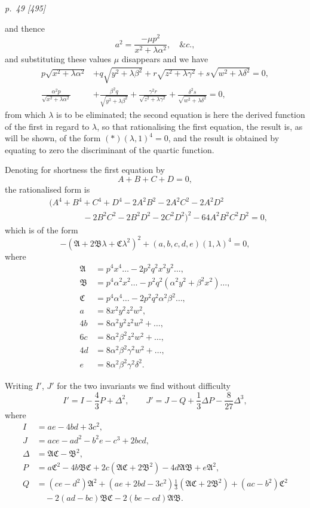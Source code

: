 ﻿\documentclass[11pt,a4paper]{article}
\theoremstyle{plain}
\theoremstyle{definition}
\newcommand{\frA}{\mathfrak{A}}
\newcommand{\frB}{\mathfrak{B}}
\newcommand{\frC}{\mathfrak{C}}
\begin{document}
\clearpage
\textit{p.~49 [495]}

and thence
\[
a^2=\frac{-\mu p^2}{x^2+\lambda\alpha^2},\quad \&c.,
\]
and substituting these values \(\mu\) disappears and we have
\[
\begin{aligned}
p\sqrt{x^2+\lambda\alpha^2}
&+q\sqrt{y^2+\lambda\beta^2}
+r\sqrt{z^2+\lambda\gamma^2}
+s\sqrt{w^2+\lambda\delta^2}=0,\\
\frac{\alpha^2p}{\sqrt{x^2+\lambda\alpha^2}}
&+\frac{\beta^2q}{\sqrt{y^2+\lambda\beta^2}}
+\frac{\gamma^2r}{\sqrt{z^2+\lambda\gamma^2}}
+\frac{\delta^2s}{\sqrt{w^2+\lambda\delta^2}}=0,
\end{aligned}
\]
from which \(\lambda\) is to be eliminated; the second equation is here
the derived function of the first in regard to \(\lambda\), so that
rationalising the first equation, the result is, as will be shown, of the
form \((*)(\lambda,1)^4=0\), and the result is obtained by equating to zero
the discriminant of the quartic function.

Denoting for shortness the first equation by
\[
A+B+C+D=0,
\]
the rationalised form is
\[
\begin{aligned}
&(A^4+B^4+C^4+D^4-2A^2B^2-2A^2C^2-2A^2D^2\\
&\qquad\qquad -2B^2C^2-2B^2D^2-2C^2D^2)^2
-64A^2B^2C^2D^2=0,
\end{aligned}
\]
which is of the form
\[
-(\frA+2\frB\lambda+\frC\lambda^2)^2
+(a,b,c,d,e)(1,\lambda)^4=0,
\]
where
\[
\begin{aligned}
\frA&=p^4x^4\ldots-2p^2q^2x^2y^2\ldots,\\
\frB&=p^4\alpha^2x^2\ldots-p^2q^2(\alpha^2y^2+\beta^2x^2)\ldots,\\
\frC&=p^4\alpha^4\ldots-2p^2q^2\alpha^2\beta^2\ldots,\\
a&=8x^2y^2z^2w^2,\\
4b&=8\alpha^2y^2z^2w^2+\ldots,\\
6c&=8\alpha^2\beta^2z^2w^2+\ldots,\\
4d&=8\alpha^2\beta^2\gamma^2w^2+\ldots,\\
e&=8\alpha^2\beta^2\gamma^2\delta^2.
\end{aligned}
\]

Writing \(I'\), \(J'\) for the two invariants we find without difficulty
\[
I'=I-\frac{4}{3}P+\Delta^2,\qquad
J'=J-Q+\frac{1}{3}\Delta P-\frac{8}{27}\Delta^3,
\]
where
\[
\begin{aligned}
I&=ae-4bd+3c^2,\\
J&=ace-ad^2-b^2e-c^3+2bcd,\\
\Delta&=\frA\frC-\frB^2,\\
P&=a\frC^2-4b\frB\frC+2c(\frA\frC+2\frB^2)-4d\frA\frB+e\frA^2,\\
Q&=(ce-d^2)\frA^2+(ae+2bd-3c^2)\frac{1}{3}(\frA\frC+2\frB^2)
+(ac-b^2)\frC^2\\
&\quad-2(ad-bc)\frB\frC-2(be-cd)\frA\frB.
\end{aligned}
\]
\end{document}
